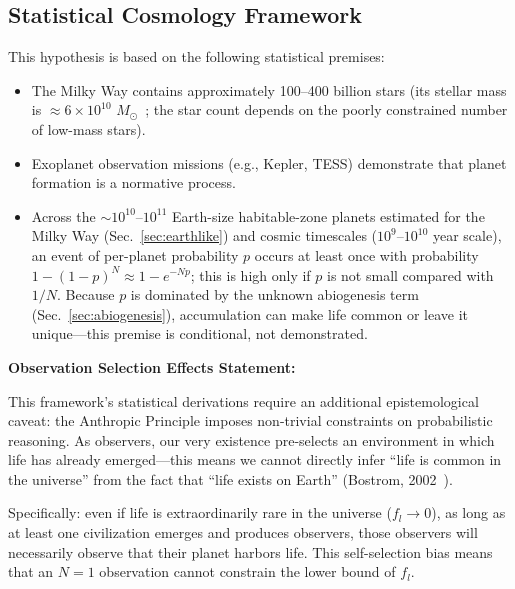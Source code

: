 \documentclass[aps,prd,twocolumn,superscriptaddress,nofootinbib]{revtex4-2}
\begin{document}
\subsection{Statistical Cosmology Framework}\label{sec:stat-cosmo}

This hypothesis is based on the following statistical premises:

\begin{itemize}
  \item The Milky Way contains approximately 100--400 billion stars (its stellar mass is $\approx6\times10^{10}$ $M_{\odot}$~\cite{Licquia2015}; the star count depends on the poorly constrained number of low-mass stars).
  \item Exoplanet observation missions (e.g., Kepler, TESS) demonstrate that planet formation is a normative process.
  \item Across the ${\sim}10^{10}$--$10^{11}$ Earth-size habitable-zone planets estimated for the Milky Way (Sec.~\ref{sec:earthlike}) and cosmic timescales ($10^{9}$--$10^{10}$ year scale), an event of per-planet probability $p$ occurs at least once with probability $1-(1-p)^{N}\approx 1-e^{-Np}$; this is high only if $p$ is not small compared with $1/N$. Because $p$ is dominated by the unknown abiogenesis term (Sec.~\ref{sec:abiogenesis}), accumulation can make life common or leave it unique---this premise is conditional, not demonstrated.
\end{itemize}

\textbf{Observation Selection Effects Statement:}

This framework's statistical derivations require an additional epistemological caveat: the Anthropic Principle imposes non-trivial constraints on probabilistic reasoning. As observers, our very existence pre-selects an environment in which life has already emerged---this means we cannot directly infer ``life is common in the universe'' from the fact that ``life exists on Earth'' (Bostrom, 2002~\cite{Bostrom2002}).

Specifically: even if life is extraordinarily rare in the universe ($f_l \to 0$), as long as at least one civilization emerges and produces observers, those observers will necessarily observe that their planet harbors life. This self-selection bias means that an $N=1$ observation cannot constrain the lower bound of $f_l$.
\end{document}
